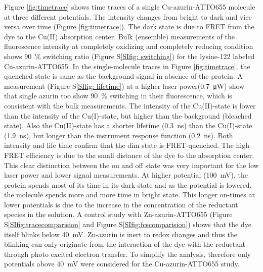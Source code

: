Figure \ref{fig:timetrace} shows time traces of a single Cu-azurin-ATTO655 molecule at three different potentials. 
The intensity changes from bright to dark and vice versa over time (Figure \ref{fig:timetrace}).
The dark state is due to FRET from the dye to the Cu(II) absorption center\cite{kuznetsova2006a}.
Bulk (ensemble) measurements of the fluorescence intensity at completely oxidizing and completely reducing condition shows \SI{90}{\percent} switching ratio (Figure S\ref{SIfig: switching}) for the lysine-122 labeled Cu-azurin-ATTO655.\cite{nicolardi2012topdown}
In the single-molecule traces in Figure \ref{fig:timetrace}, the quenched state is same as the background signal in absence of the protein.
A measurement (Figure S\ref{SIfig: lifetime}) at a higher laser power(\SI{0.7}{\uW}) show that single azurin too show \SI{90}{\percent} switching in their fluorescence, which is consistent with the bulk measurements.
The intensity of the Cu(II)-state is lower than the intensity of the Cu(I)-state, but higher than the background (bleached state).
Also the Cu(II)-state has a shorter lifetime (\SI{0.3}{\ns}) than the Cu(I)-state (\SI{1.9}{\ns}), but longer than the instrument response function (\SI{0.2}{\ns}). 
Both intensity and life time confirm that the dim state is FRET-quenched.
The high FRET efficiency is due to the small distance of the dye to the absorption center.
This clear distinction between the on and off state was very important for the low laser power and lower signal measurements.
At higher potential (\SI{100}{\mV}), the protein spends most of its time in its dark state and as the potential is lowered, the molecule spends more and more time in bright state.
This longer on-times at lower potentials is due to the increase in the concentration of the reductant species in the solution.
A control study with Zn-azurin-ATTO655 (Figure S\ref{SIfig:tracecomparision} and Figure S\ref{SIfig:fcscomparision}) shows that the dye itself blinks below \SI{40}{\mV}.
Zn-azurin is inert to redox changes and thus the blinking can only originate from the interaction of the dye with the reductant through photo excited electron transfer.
To simplify the analysis, therefore only potentials above \SI{40}{\mV} were considered for the Cu-azurin-ATTO655 study.\\

